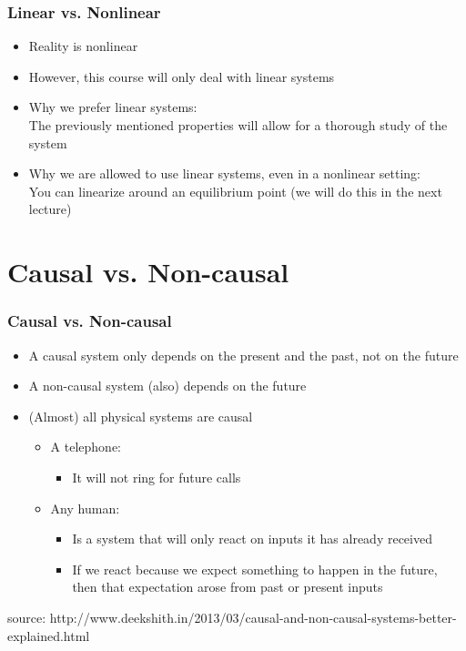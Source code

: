 \documentclass{beamer}
\begin{document}

\begin{frame}
\frametitle{Linear vs. Nonlinear}
\vspace{-8ex}
\begin{itemize}
\item Reality is nonlinear
\item However, this course will only deal with linear systems
\item Why we prefer linear systems: \\
\medskip
The previously mentioned properties will allow for a thorough study of the system
\item Why we are allowed to use linear systems, even in a nonlinear setting:\\
\medskip
You can linearize around an equilibrium point (we will do this in the next lecture)
\end{itemize}
\end{frame}

\section{Causal vs. Non-causal} 

\begin{frame}
\frametitle{Causal vs. Non-causal}
\begin{itemize}
\item \normalsize{A causal system only depends on the present and the past, not on the future}
\item \normalsize{A non-causal system (also) depends on the future}
\item \normalsize{(Almost) all physical systems are causal}
\begin{itemize}
\item \normalsize{A telephone:}
\begin{itemize}
\item \normalsize{It will not ring for future calls}
\end{itemize}
\item \normalsize{Any human:} 
\begin{itemize}
\item \normalsize{Is a system that will only react on inputs it has already received}
\item \normalsize{If we react because we expect something to happen in the future, then that expectation arose from past or present inputs}
\end{itemize}
\end{itemize}
\end{itemize}
\bigskip
\bigskip
\footnotesize{source: http://www.deekshith.in/2013/03/causal-and-non-causal-systems-better-explained.html}
\end{frame}
\end{document}
